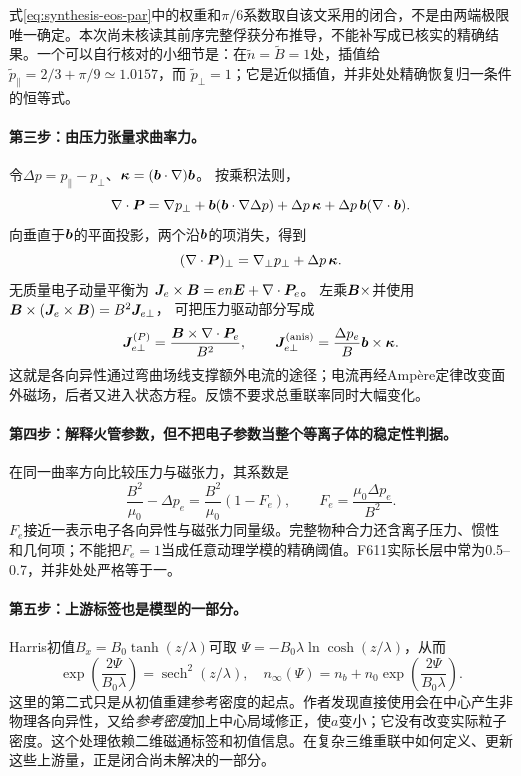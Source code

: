 式\eqref{eq:synthesis-eos-par}中的权重和$\pi/6$系数取自该文采用的闭合，不是由两端极限唯一确定。本次尚未核读其前序完整俘获分布推导，不能补写成已核实的精确结果。一个可以自行核对的小细节是：在$\widetilde n=\widetilde B=1$处，插值给
$\widetilde p_\parallel=2/3+\pi/9\simeq1.0157$，而
$\widetilde p_\perp=1$；它是近似插值，并非处处精确恢复归一条件的恒等式。

\paragraph{第三步：由压力张量求曲率力。}
令$\Delta p=p_\parallel-p_\perp$、$\bm{\kappa}=(\bm{b}\cdot\nabla)\bm{b}$。
按乘积法则，
\begin{equation}
\nabla\cdot\bm{P}
=\nabla p_\perp+\bm{b}(\bm{b}\cdot\nabla\Delta p)
 +\Delta p\,\bm{\kappa}+\Delta p\,\bm{b}(\nabla\cdot\bm{b}).
\end{equation}
向垂直于$\bm{b}$的平面投影，两个沿$\bm{b}$的项消失，得到
\begin{equation}
(\nabla\cdot\bm{P})_\perp=\nabla_\perp p_\perp+\Delta p\,\bm{\kappa} .
\end{equation}
无质量电子动量平衡为
$\bm{J}_e\times\bm{B}=en\bm{E}+\nabla\cdot\bm{P}_e$。
左乘$\bm{B}\times$并使用
$\bm{B}\times(\bm{J}_e\times\bm{B})=B^2\bm{J}_{e\perp}$，
可把压力驱动部分写成
\begin{equation}
\bm{J}_{e\perp}^{(P)}
=\frac{\bm{B}\times\nabla\cdot\bm{P}_e}{B^2},\qquad
\bm{J}_{e\perp}^{(\mathrm{anis})}
=\frac{\Delta p_e}{B}\bm{b}\times\bm{\kappa} .
\end{equation}
这就是各向异性通过弯曲场线支撑额外电流的途径；电流再经Ampère定律改变面外磁场，后者又进入状态方程。反馈不要求总重联率同时大幅变化。

\paragraph{第四步：解释火管参数，但不把电子参数当整个等离子体的稳定性判据。}
在同一曲率方向比较压力与磁张力，其系数是
\begin{equation}
\frac{B^2}{\mu_0}-\Delta p_e
=\frac{B^2}{\mu_0}(1-F_e),\qquad
F_e=\frac{\mu_0\Delta p_e}{B^2}.
\end{equation}
$F_e$接近一表示电子各向异性与磁张力同量级。完整物种合力还含离子压力、惯性和几何项；不能把$F_e=1$当成任意动理学模的精确阈值。F611实际长层中常为0.5--0.7，并非处处严格等于一。

\paragraph{第五步：上游标签也是模型的一部分。}
Harris初值$B_x=B_0\tanh(z/\lambda)$可取
$\Psi=-B_0\lambda\ln\cosh(z/\lambda)$，从而
\begin{equation}
\exp\!\left(\frac{2\Psi}{B_0\lambda}\right)
=\operatorname{sech}^2(z/\lambda),\quad
n_\infty(\Psi)=n_b+n_0\exp\!\left(\frac{2\Psi}{B_0\lambda}\right).
\end{equation}
这里的第二式只是从初值重建参考密度的起点。作者发现直接使用会在中心产生非物理各向异性，又给\emph{参考密度}加上中心局域修正，使$a$变小；它没有改变实际粒子密度。这个处理依赖二维磁通标签和初值信息。在复杂三维重联中如何定义、更新这些上游量，正是闭合尚未解决的一部分。

